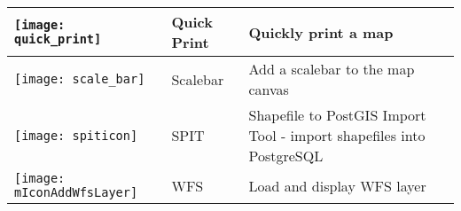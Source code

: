 \begin{minipage}{\textwidth}
\begin{table}[H]
\begin{tabular}{|l|l|p{4in}|}
\hline
\texttt{[image: quick\_print]}
 & Quick Print \index{plugins!quickprint}& Quickly print a map \\
\hline
\texttt{[image: scale\_bar]}
 & Scalebar \index{plugins!scalebar}& Add a scalebar to the map canvas\\
\hline
\texttt{[image: spiticon]}
 & SPIT \index{plugins!spit}& Shapefile to PostGIS Import Tool - import shapefiles into PostgreSQL\\
\hline 
\texttt{[image: mIconAddWfsLayer]}
 & WFS & Load and display WFS layer \\
\hline
\end{tabular}
\end{table}
\end{minipage}

\normalsize


\begin{Tip}\caption{\textsc{Plugins Settings Saved to Project}}
\end{Tip}


